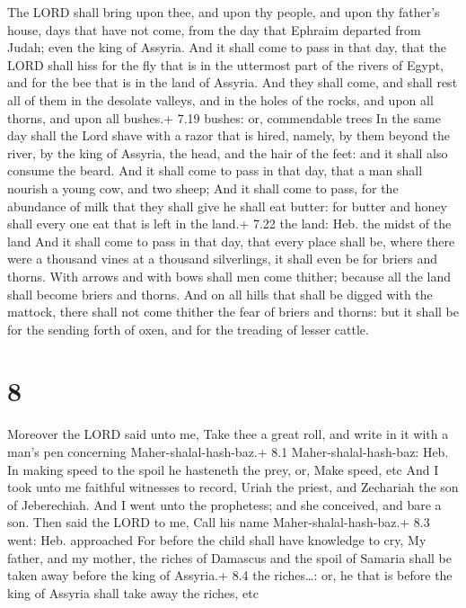 The LORD shall bring upon thee, and upon thy people, and
upon thy father's house, days that have not come, from the day that
Ephraim departed from Judah; even the king of Assyria.  And
it shall come to pass in that day, that the LORD shall hiss for the fly
that is in the uttermost part of the rivers of Egypt, and for the bee
that is in the land of Assyria.  And they shall come, and
shall rest all of them in the desolate valleys, and in the holes of the
rocks, and upon all thorns, and upon all bushes.+ 7.19 bushes: or,
commendable trees  In the same day shall the Lord shave
with a razor that is hired, namely, by them beyond the river, by the
king of Assyria, the head, and the hair of the feet: and it shall also
consume the beard.  And it shall come to pass in that day,
that a man shall nourish a young cow, and two sheep;  And
it shall come to pass, for the abundance of milk that they shall give he
shall eat butter: for butter and honey shall every one eat that is left
in the land.+ 7.22 the land: Heb. the midst of the land 
And it shall come to pass in that day, that every place shall be, where
there were a thousand vines at a thousand silverlings, it shall even be
for briers and thorns.  With arrows and with bows shall men
come thither; because all the land shall become briers and thorns.
 And on all hills that shall be digged with the mattock,
there shall not come thither the fear of briers and thorns: but it shall
be for the sending forth of oxen, and for the treading of lesser cattle.

\hypertarget{section-7}{%
\section{8}\label{section-7}}

 Moreover the LORD said unto me, Take thee a great roll, and
write in it with a man's pen concerning Maher-shalal-hash-baz.+ 8.1
Maher-shalal-hash-baz: Heb. In making speed to the spoil he hasteneth
the prey, or, Make speed, etc  And I took unto me faithful
witnesses to record, Uriah the priest, and Zechariah the son of
Jeberechiah.  And I went unto the prophetess; and she
conceived, and bare a son. Then said the LORD to me, Call his name
Maher-shalal-hash-baz.+ 8.3 went: Heb. approached  For
before the child shall have knowledge to cry, My father, and my mother,
the riches of Damascus and the spoil of Samaria shall be taken away
before the king of Assyria.+ 8.4 the riches\ldots: or, he that is before
the king of Assyria shall take away the riches, etc

